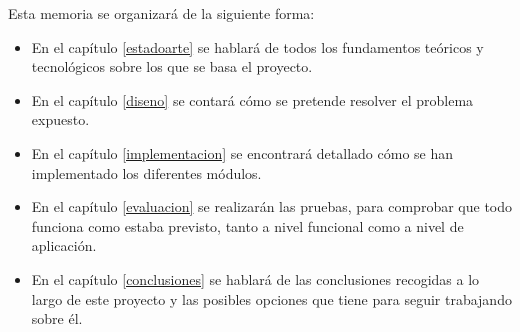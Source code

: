 Esta memoria se organizará de la siguiente forma: 
\begin{itemize}
\item En el capítulo \ref{estadoarte} se hablará de todos los fundamentos teóricos y tecnológicos sobre los que se 
basa el proyecto.
\item En el capítulo \ref{diseno} se contará cómo se pretende resolver el problema expuesto.
\item En el capítulo \ref{implementacion} se encontrará detallado cómo se han implementado los diferentes módulos.
\item En el capítulo \ref{evaluacion} se realizarán las pruebas, para comprobar que todo funciona como 
estaba previsto, tanto a nivel funcional como a nivel de aplicación.
\item En el capítulo \ref{conclusiones} se hablará de las conclusiones recogidas a lo largo de este proyecto y las posibles 
opciones que tiene para seguir trabajando sobre él.
\end{itemize}
